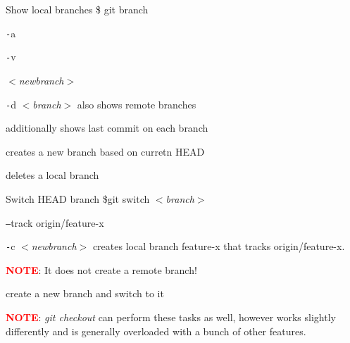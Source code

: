 \begin{tcolorbox}[ titleBox, title=BRANCHES \& TAGS]
    \begin{tcolorbox}[innerBox]
        Show local branches
      \tcblower
        \$ git branch
    \end{tcolorbox}
    \begin{tcolorbox}[splitBox, lefthand ratio=0.30, fontupper = \small, fontlower = \small]
        \texttt{-}\hspace{0.5mm}a 
        \par\vspace{4mm}
        \texttt{-}\hspace{0.5mm}v
        \par\vspace{4mm}
        $<$\textit{newbranch}$>$
        \par\vspace{4mm}
        \texttt{-}\hspace{0.5mm}d $<$\textit{branch}$>$
      \tcblower
        also shows remote branches
        \par\vspace{2mm}
        additionally shows last commit on each branch
        \par\vspace{2mm}
        creates a new branch based on curretn HEAD
        \par\vspace{2mm}
        deletes a local branch
    \end{tcolorbox}

    \begin{tcolorbox}[innerBox]
        Switch HEAD branch
      \tcblower
        \$git switch $<$\textit{branch}$>$
    \end{tcolorbox}
    \begin{tcolorbox}[splitBox, lefthand ratio=0.38, fontupper = \small, fontlower = \small]
        \texttt{--}\hspace{0.5mm}track origin/feature-x 
        \par\vspace{9mm}
        \texttt{-}\hspace{0.5mm}c $<$\textit{newbranch}$>$
      \tcblower
        creates local branch feature-x that tracks origin/feature-x. \par\textcolor{red}{\textbf{NOTE}}: It does not create a remote branch!
        \par\vspace{3mm}
        create a new branch and switch to it
    \end{tcolorbox}
    \begin{tcolorbox}[infoBox]
        \textcolor{red}{\textbf{NOTE}}: \textit{git checkout} can perform these tasks as well, however works slightly differently and is generally overloaded with a bunch of other features.
    \end{tcolorbox}


\end{tcolorbox}
